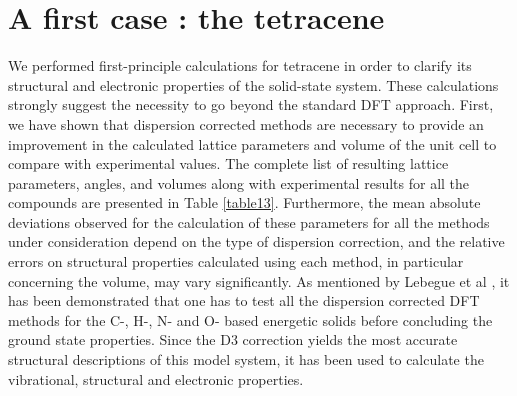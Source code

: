 \section{A first case : the tetracene}

We performed first-principle calculations for tetracene in order to clarify its structural and electronic properties of the solid-state system. These calculations strongly suggest the necessity to go beyond the standard DFT approach. First, we have shown that dispersion corrected methods are necessary to provide an improvement in the calculated lattice parameters and volume of the unit cell to compare with experimental values. The complete list of resulting lattice parameters, angles, and volumes along with experimental results for all the compounds are presented in Table \ref{table13}. Furthermore, the mean absolute deviations observed for the calculation of these parameters for all the methods under consideration depend on the type of dispersion correction, and the relative errors on structural properties calculated using each method, in particular concerning the volume, may vary significantly. As mentioned by Lebegue et al \cite{appalakondaiah2015dispersion}, it has been demonstrated that one has to test all the dispersion corrected DFT methods for the C-, H-, N- and O- based energetic solids before concluding the ground state properties. Since the D3 correction yields the most accurate structural descriptions of this model system, it has been used to calculate the vibrational, structural and electronic properties.\\
 
